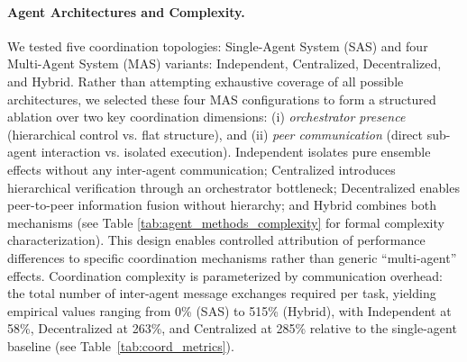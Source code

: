 \paragraph{Agent Architectures and Complexity.}
We tested five coordination topologies: Single-Agent System (SAS) and four Multi-Agent System (MAS) variants: Independent, Centralized, Decentralized, and Hybrid. Rather than attempting exhaustive coverage of all possible architectures, we selected these four MAS configurations to form a structured ablation over two key coordination dimensions: 
(i) \textit{orchestrator presence} (hierarchical control vs. flat structure), and (ii) \textit{peer communication} (direct sub-agent interaction vs. isolated execution). Independent isolates pure ensemble effects without any inter-agent communication; Centralized introduces hierarchical verification through an orchestrator bottleneck; Decentralized enables 
peer-to-peer information fusion without hierarchy; and Hybrid combines both mechanisms (see Table \ref{tab:agent_methods_complexity} for formal complexity characterization). This design enables controlled
attribution of performance differences to specific coordination
mechanisms rather than generic ``multi-agent'' effects. Coordination complexity is parameterized by communication overhead: the total number of inter-agent message exchanges required per task, yielding empirical values ranging from 0\% (SAS) to 515\% (Hybrid), with Independent at 58\%, Decentralized at 263\%, and Centralized at 285\% relative to the single-agent baseline (see Table~\ref{tab:coord_metrics}).
  
